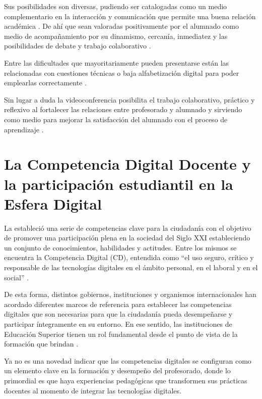 \documentclass[spanish]{textolivre}
\begin{document}
Sus posibilidades son diversas, pudiendo ser catalogadas como un medio complementario en la interacción y comunicación que permite una buena relación académica \cite{cordova_uso_2013}. De ahí que sean valoradas positivamente por el alumnado como medio de acompañamiento \cite{rodriguez_zidan_b-learning_2019,huergo-tobar_estrategias_1970} por su dinamismo, cercanía, inmediatez y las posibilidades de debate y trabajo colaborativo \cite{mariana_dallera_videoconferencia_2014,lin_students_2020}.

Entre las dificultades que mayoritariamente pueden presentarse están las relacionadas con cuestiones técnicas o baja alfabetización digital para poder emplearlas correctamente \cite{mariana_dallera_videoconferencia_2014}.

Sin lugar a duda la videoconferencia posibilita el trabajo colaborativo, práctico y reflexivo \cite{rosen_fostering_2020} al fortalecer las relaciones entre profesorado y alumnado \cite{anastasiades_interactive_2010} y sirviendo como medio para mejorar la satisfacción del alumnado con el proceso de aprendizaje \cite{jones_comparison_2010}.




\section{La Competencia Digital Docente y la participación estudiantil en la Esfera Digital}\label{sec-competencia}

La \textcite{riina_vuorikari_digcomp_2016} estableció una serie de competencias clave para la ciudadanía con el objetivo de promover una participación plena en la sociedad del Siglo XXI estableciendo un conjunto de conocimientos, habilidades y actitudes. Entre los mismos se encuentra la Competencia Digital (CD), entendida como “el uso seguro, crítico y responsable de las tecnologías digitales en el ámbito personal, en el laboral y en el social” \cite[p.~4]{riina_vuorikari_digcomp_2016}.

De esta forma, distintos gobiernos, instituciones y organismos internacionales han acordado diferentes marcos de referencia para establecer las competencias digitales que son necesarias para que la ciudadanía pueda desempeñarse y participar íntegramente en su entorno. En ese sentido, las instituciones de Educación Superior tienen un rol fundamental desde el punto de vista de la formación que brindan \cite{recio_munoz_alisis_2020}.

Ya no es una novedad indicar que las competencias digitales se configuran como un elemento clave en la formación y desempeño del profesorado, donde lo primordial es que haya experiencias pedagógicas que transformen sus prácticas docentes al momento de integrar las tecnologías digitales.
\end{document}
